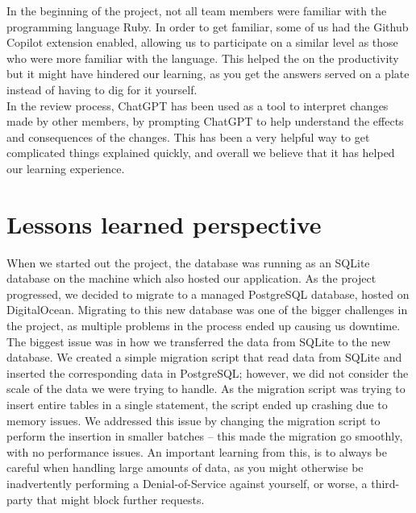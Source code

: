 \documentclass{article}
\begin{document}
In the beginning of the project, not all team members were familiar with the programming language Ruby. In order to get familiar, some of us had the Github Copilot extension enabled, allowing us to participate on a similar level as those who were more familiar with the language.
This helped the on the productivity but it might have hindered our learning, as you get the answers served on a plate instead of having to dig for it yourself.\\

In the review process, ChatGPT has been used as a tool to interpret changes made by other members, by prompting ChatGPT to help understand the effects and consequences of the changes. This has been a very helpful way to get complicated things explained quickly, and overall we believe that it has helped our learning experience. 

\section{Lessons learned perspective}

When we started out the project, the database was running as an SQLite database on the machine which also hosted our application. As the project progressed, we decided to migrate to a managed PostgreSQL database, hosted on DigitalOcean. Migrating to this new database was one of the bigger challenges in the project, as multiple problems in the process ended up causing us downtime.
The biggest issue was in how we transferred the data from SQLite to the new database. We created a simple migration script that read data from SQLite and inserted the corresponding data in PostgreSQL; however, we did not consider the scale of the data we were trying to handle.
As the migration script was trying to insert entire tables in a single statement, the script ended up crashing due to memory issues.
We addressed this issue by changing the migration script to perform the insertion in smaller batches -- this made the migration go smoothly, with no performance issues.
An important learning from this, is to always be careful when handling large amounts of data, as you might otherwise be inadvertently performing a Denial-of-Service against yourself, or worse, a third-party that might block further requests.
\end{document}
